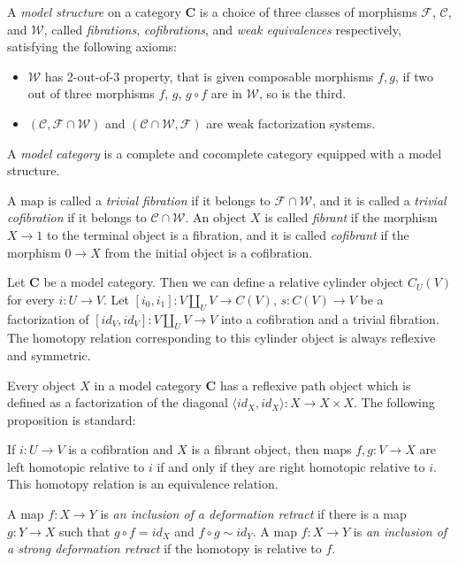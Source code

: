 \documentclass{tac}
\theoremstyle{definition}
\newcommand{\we}{\mathcal{W}}
\newcommand{\fib}{\mathcal{F}}
\newcommand{\cof}{\mathcal{C}}
\newcommand{\cat}[1]{\mathbf{#1}}
\newcommand{\C}{\cat{C}}
\newcommand{\cyli}{i}
\begin{document}
\begin{defn}
A \emph{model structure} on a category $\C$ is a choice of three classes of morphisms $\fib$, $\cof$, and $\we$,
called \emph{fibrations}, \emph{cofibrations}, and \emph{weak equivalences} respectively, satisfying the following axioms:
\begin{itemize}
\item $\we$ has 2-out-of-3 property, that is given composable morphisms $f,g$,
    if two out of three morphisms $f$, $g$, $g \circ f$ are in $\we$, so is the third.
\item $(\cof, \fib \cap \we)$ and $(\cof \cap \we, \fib)$ are weak factorization systems.
\end{itemize}
A \emph{model category} is a complete and cocomplete category equipped with a model structure.
\end{defn}

A map is called a \emph{trivial fibration} if it belongs to $\fib \cap \we$,
and it is called a \emph{trivial cofibration} if it belongs to $\cof \cap \we$.
An object $X$ is called \emph{fibrant} if the morphism $X \to 1$ to the terminal object is a fibration,
and it is called \emph{cofibrant} if the morphism $0 \to X$ from the initial object is a cofibration.

Let $\C$ be a model category.
Then we can define a relative cylinder object $C_U(V)$ for every $i : U \to V$.
Let $[\cyli_0,\cyli_1] : V \amalg_U V \to C(V)$, $s : C(V) \to V$ be a factorization of $[id_V,id_V] : V \amalg_U V \to V$ into a cofibration and a trivial fibration.
The homotopy relation corresponding to this cylinder object is always reflexive and symmetric.

Every object $X$ in a model category $\C$ has a reflexive path object which is defined as a factorization of the diagonal $\langle id_X, id_X \rangle : X \to X \times X$.
The following proposition is standard:
\begin{prop}
If $i : U \to V$ is a cofibration and $X$ is a fibrant object, then maps $f,g : V \to X$ are left homotopic relative to $i$ if and only if they are right homotopic relative to $i$.
This homotopy relation is an equivalence relation.
\end{prop}

A map $f : X \to Y$ is \emph{an inclusion of a deformation retract} if there is
a map $g : Y \to X$ such that $g \circ f = id_X$ and $f \circ g \sim id_Y$.
A map $f : X \to Y$ is \emph{an inclusion of a strong deformation retract} if the homotopy is relative to $f$.
\end{document}
